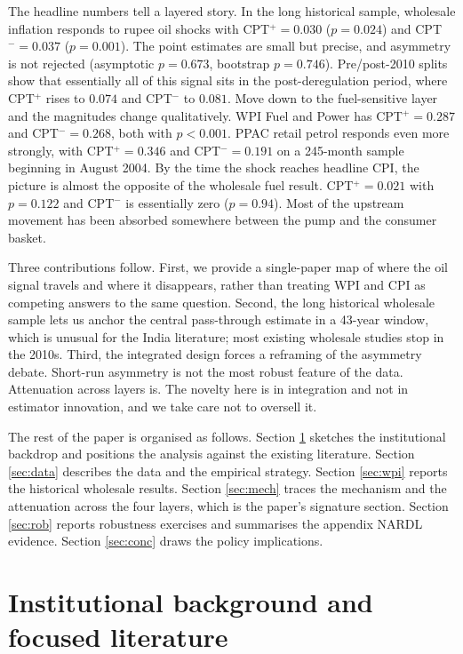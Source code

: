 \documentclass[11pt,a4paper]{article}
\begin{document}
The headline numbers tell a layered story. In the long historical sample, wholesale inflation responds to rupee oil shocks with CPT$^+ = 0.030$ ($p = 0.024$) and CPT$^- = 0.037$ ($p = 0.001$). The point estimates are small but precise, and asymmetry is not rejected (asymptotic $p = 0.673$, bootstrap $p = 0.746$). Pre/post-2010 splits show that essentially all of this signal sits in the post-deregulation period, where CPT$^+$ rises to $0.074$ and CPT$^-$ to $0.081$. Move down to the fuel-sensitive layer and the magnitudes change qualitatively. WPI Fuel and Power has CPT$^+ = 0.287$ and CPT$^- = 0.268$, both with $p < 0.001$. PPAC retail petrol responds even more strongly, with CPT$^+ = 0.346$ and CPT$^- = 0.191$ on a 245-month sample beginning in August 2004. By the time the shock reaches headline CPI, the picture is almost the opposite of the wholesale fuel result. CPT$^+ = 0.021$ with $p = 0.122$ and CPT$^- $ is essentially zero ($p = 0.94$). Most of the upstream movement has been absorbed somewhere between the pump and the consumer basket.

Three contributions follow. First, we provide a single-paper map of where the oil signal travels and where it disappears, rather than treating WPI and CPI as competing answers to the same question. Second, the long historical wholesale sample lets us anchor the central pass-through estimate in a 43-year window, which is unusual for the India literature; most existing wholesale studies stop in the 2010s. Third, the integrated design forces a reframing of the asymmetry debate. Short-run asymmetry is not the most robust feature of the data. Attenuation across layers is. The novelty here is in integration and not in estimator innovation, and we take care not to oversell it.

The rest of the paper is organised as follows. Section \ref{sec:back} sketches the institutional backdrop and positions the analysis against the existing literature. Section \ref{sec:data} describes the data and the empirical strategy. Section \ref{sec:wpi} reports the historical wholesale results. Section \ref{sec:mech} traces the mechanism and the attenuation across the four layers, which is the paper's signature section. Section \ref{sec:rob} reports robustness exercises and summarises the appendix NARDL evidence. Section \ref{sec:conc} draws the policy implications.

\section{Institutional background and focused literature}
\label{sec:back}
\end{document}
